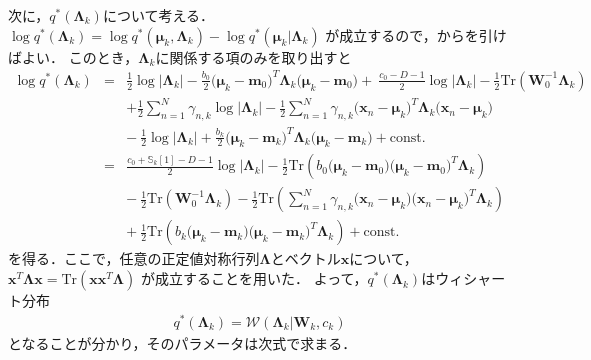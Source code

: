 次に，$q^*(\bm\Lambda_{k})$について考える．
$\log q^*(\bm\Lambda_{k})
=\log q^*(\bm\mu_{k},\bm\Lambda_{k}) - \log q^*(\bm\mu_{k}|\bm\Lambda_{k})$
が成立するので，からを引けばよい．
このとき，$\bm\Lambda_{k}$に関係する項のみを取り出すと
\begin{eqnarray}
 \log q^*(\bm\Lambda_{k})
&=&
\frac{1}{2}\log|\bm\Lambda_{k}|
- \frac{b_0}{2} 
\bigl(\bm\mu_{k} - \bm{m}_0\bigr)^T\bm\Lambda_{k}
\bigl(\bm\mu_{k} - \bm{m}_0\bigr)
+ \ \frac{c_0 - D - 1}{2} \log|\bm\Lambda_{k}|
- \frac{1}{2}\mbox{Tr}\left(\bm{W}_0^{-1}\bm\Lambda_{k}\right)
\nonumber\\
&&
+ \frac{1}{2} \sum_{n=1}^{N} \gamma_{n,k}
\log|\bm\Lambda_{k}|
- \frac{1}{2} \sum_{n=1}^{N} \gamma_{n,k}
\bigl(\bm{x}_n - \bm\mu_{k}\bigr)^T
\bm\Lambda_{k}\bigl(\bm{x}_n - \bm\mu_{k}\bigr)
\nonumber \\
&&
- \ \frac{1}{2} \log|\bm\Lambda_{k}|
+ \frac{b_{k}}{2} 
\bigl(\bm\mu_{k} - \bm{m}_{k}\bigr)^T\bm\Lambda_{k}
\bigl(\bm\mu_{k} - \bm{m}_{k}\bigr)
+ \mbox{const.}
\nonumber \\
&=&
\frac{c_0 + \mathbb{S}_{k}[1] - D - 1}{2} \log|\bm\Lambda_{k}|
- \frac{1}{2} \mbox{Tr}
\left(b_0\bigl(\bm\mu_{k} - \bm{m}_0\bigr)
             \bigl(\bm\mu_{k} - \bm{m}_0\bigr)^T\bm\Lambda_{k}\right)
\nonumber \\
&&
- \ \frac{1}{2}\mbox{Tr}\left(\bm{W}_0^{-1}\bm\Lambda_{k}\right)
- \frac{1}{2}\mbox{Tr}\left(
\sum_{n=1}^{N} 
\gamma_{n,k}
\bigl(\bm{x}_n - \bm\mu_{k}\bigr)
\bigl(\bm{x}_n - \bm\mu_{k}\bigr)^T\bm\Lambda_{k}
\right)
\nonumber \\
&&
+ \ \frac{1}{2} \mbox{Tr}\left(
b_{k} \bigl(\bm\mu_{k} - \bm{m}_{k}\bigr)
      \bigl(\bm\mu_{k} - \bm{m}_{k}\bigr)^T\bm\Lambda_{k}
\right)+ \mbox{const.}
\end{eqnarray}
を得る．ここで，任意の正定値対称行列$\bm{\Lambda}$とベクトル$\bm{x}$について，
$\bm{x}^T\bm{\Lambda}\bm{x}=\mbox{Tr}(\bm{x}\bm{x}^T\bm{\Lambda})$
が成立することを用いた．
よって，$q^*(\bm\Lambda_{k})$はウィシャート分布
\begin{eqnarray}
 q^*(\bm\Lambda_{k}) = \mathcal{W}\left(\bm\Lambda_{k}\big|\bm{W}_{k},c_{k}\right)
\end{eqnarray}
となることが分かり，そのパラメータは次式で求まる．
